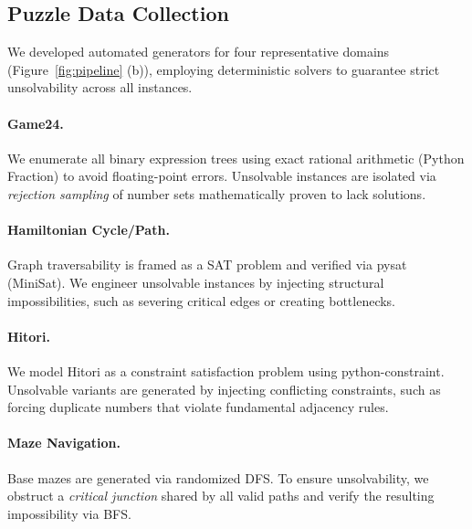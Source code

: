 \subsection{Puzzle Data Collection}
\label{sec:logic_gen}

We developed automated generators for four representative domains (Figure~\ref{fig:pipeline} (b)), employing deterministic solvers to guarantee strict unsolvability across all instances.

\paragraph{Game24.} 
We enumerate all binary expression trees using exact rational arithmetic (Python Fraction) to avoid floating-point errors. Unsolvable instances are isolated via \textit{rejection sampling} of number sets mathematically proven to lack solutions.

\paragraph{Hamiltonian Cycle/Path.}
Graph traversability is framed as a SAT problem and verified via pysat (MiniSat). We engineer unsolvable instances by injecting structural impossibilities, such as severing critical edges or creating bottlenecks.

\paragraph{Hitori.}
We model Hitori as a constraint satisfaction problem using python-constraint. Unsolvable variants are generated by injecting conflicting constraints, such as forcing duplicate numbers that violate fundamental adjacency rules.

\paragraph{Maze Navigation.}
Base mazes are generated via randomized DFS. To ensure unsolvability, we obstruct a \textit{critical junction} shared by all valid paths and verify the resulting impossibility via BFS.

